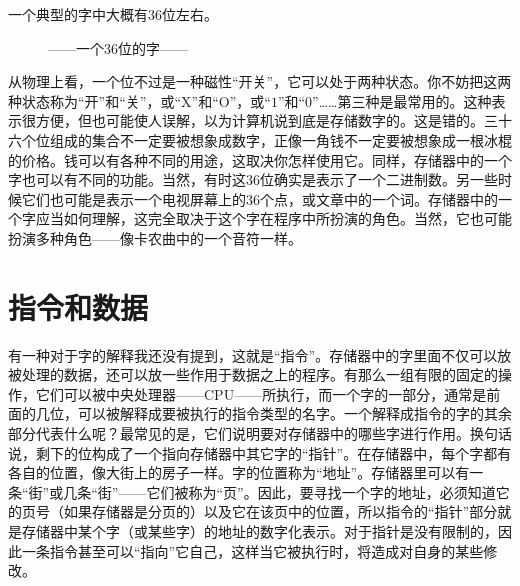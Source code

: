 一个典型的字中大概有$36$位左右。

\begin{figure}
\caption*{——一个$36$位的字——}
\end{figure}

从物理上看，一个位不过是一种磁性“开关”，它可以处于两种状态。你不妨把这两种状态称为“开”和“关”，或“X”和“O”，或“$1$”和“$0$”……第三种是最常用的。这种表示很方便，但也可能使人误解，以为计算机说到底是存储数字的。这是错的。三十六个位组成的集合不一定要被想象成数字，正像一角钱不一定要被想象成一根冰棍的价格。钱可以有各种不同的用途，这取决你怎样使用它。同样，存储器中的一个字也可以有不同的功能。当然，有时这$36$位确实是表示了一个二进制数。另一些时候它们也可能是表示一个电视屏幕上的$36$个点，或文章中的一个词。存储器中的一个字应当如何理解，这完全取决于这个字在程序中所扮演的角色。当然，它也可能扮演多种角色——像卡农曲中的一个音符一样。

\section{指令和数据}

有一种对于字的解释我还没有提到，这就是“指令”。存储器中的字里面不仅可以放被处理的数据，还可以放一些作用于数据之上的程序。有那么一组有限的固定的操作，它们可以被中央处理器——CPU——所执行，而一个字的一部分，通常是前面的几位，可以被解释成要被执行的指令类型的名字。一个解释成指令的字的其余部分代表什么呢？最常见的是，它们说明要对存储器中的哪些字进行作用。换句话说，剩下的位构成了一个指向存储器中其它字的“指针”。在存储器中，每个字都有各自的位置，像大街上的房子一样。字的位置称为“地址”。存储器里可以有一条“街”或几条“街”——它们被称为“页”。因此，要寻找一个字的地址，必须知道它的页号（如果存储器是分页的）以及它在该页中的位置，所以指令的“指针”部分就是存储器中某个字（或某些字）的地址的数字化表示。对于指针是没有限制的，因此一条指令甚至可以“指向”它自己，这样当它被执行时，将造成对自身的某些修改。

